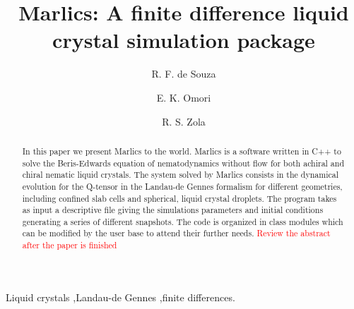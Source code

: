 \documentclass[final,5p,times,twocolumn]{elsarticle}
\begin{document}
\begin{frontmatter}



\title{Marlics: A finite difference liquid crystal simulation package}


\author[a]{R. F. de Souza }
\author[a]{E. K. Omori}
\author[a,b]{R. S. Zola}

\address[a]{Departamento de Física, Universidade Estadual de Maringá, Avenida Colombo 5790,
87020 - 900 Maringá – PR, Brazil}
\address[b]{Universidade Tecnologica Federal do Paraná, Rua Marcilio Dias 635, 86812-460 Apucarana, Paraná,
Brazil}

\begin{abstract}
  In this paper we present Marlics to the world. Marlics is a software
  written in C++ to solve the Beris-Edwards equation of
  nematodynamics without flow for both achiral and chiral nematic liquid
  crystals. The system solved by Marlics consists in the dynamical evolution for the Q-tensor in the Landau-de Gennes formalism for different geometries, including confined slab cells and spherical, liquid crystal droplets.  The program takes as input a descriptive file giving the
  simulations parameters and initial conditions generating a series of
  different snapshots. The code is organized in class modules which
  can be modified by the user base to attend their further needs.
  \textcolor{red}{Review the abstract after the paper is finished}
\end{abstract}

\begin{keyword}
Liquid crystals \sep Landau-de Gennes \sep finite differences.

\end{keyword}

\end{frontmatter}
\end{document}
